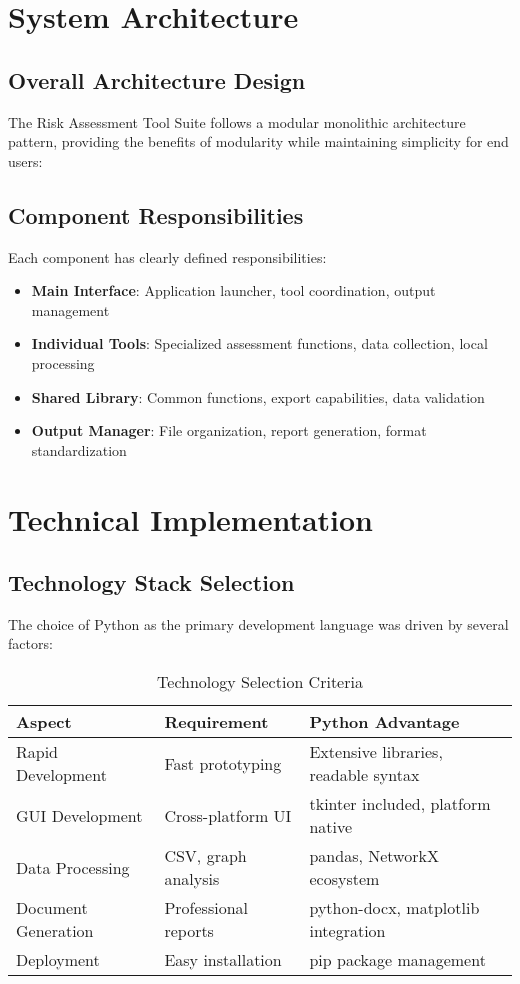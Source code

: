 \documentclass[binding=0.6cm]{sapthesis}
\begin{document}
\section{System Architecture}

\subsection{Overall Architecture Design}

The Risk Assessment Tool Suite follows a modular monolithic architecture pattern, providing the benefits of modularity while maintaining simplicity for end users:

\subsection{Component Responsibilities}

Each component has clearly defined responsibilities:

\begin{itemize}
    \item \textbf{Main Interface}: Application launcher, tool coordination, output management
    \item \textbf{Individual Tools}: Specialized assessment functions, data collection, local processing
    \item \textbf{Shared Library}: Common functions, export capabilities, data validation
    \item \textbf{Output Manager}: File organization, report generation, format standardization
\end{itemize}

\section{Technical Implementation}

\subsection{Technology Stack Selection}

The choice of Python as the primary development language was driven by several factors:

\begin{table}[H]
\centering
\caption{Technology Selection Criteria}
\begin{tabular}{|l|l|l|}
\hline
\textbf{Aspect} & \textbf{Requirement} & \textbf{Python Advantage} \\ \hline
Rapid Development & Fast prototyping & Extensive libraries, readable syntax \\ \hline
GUI Development & Cross-platform UI & tkinter included, platform native \\ \hline
Data Processing & CSV, graph analysis & pandas, NetworkX ecosystem \\ \hline
Document Generation & Professional reports & python-docx, matplotlib integration \\ \hline
Deployment & Easy installation & pip package management \\ \hline
\end{tabular}
\end{table}
\end{document}
